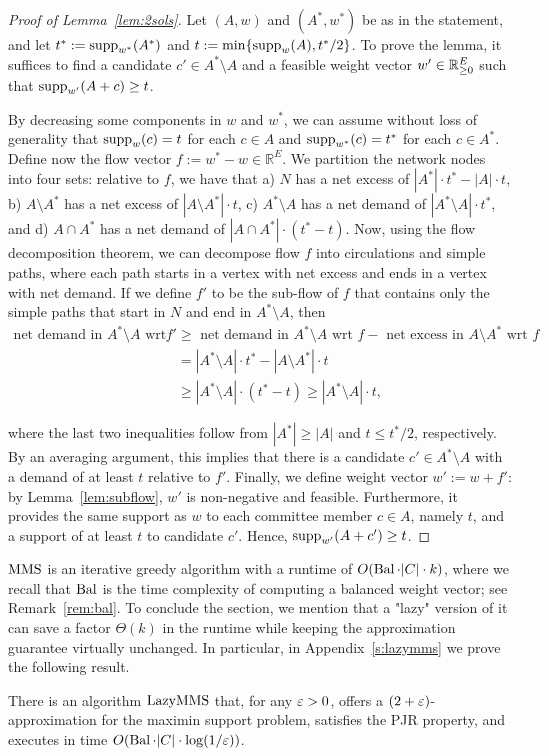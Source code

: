 \begin{proof}[Proof of Lemma~\ref{lem:2sols}]
Let $(A,w)$ and $(A^*, w^*)$ be as in the statement, and let $t^*:=\operatorname{supp}_{w^*}(A^*)$ and $t:=\min\{\operatorname{supp}_w(A), t^*/2\}$. To prove the lemma, it suffices to find a candidate $c'\in A^*\setminus A$ and a feasible weight vector $w'\in\mathbb{R}_{\geq 0}^E$ such that $\operatorname{supp}_{w'}(A+c)\geq t$.

By decreasing some components in $w$ and $w^*$, we can assume without loss of generality that $\operatorname{supp}_w(c)=t$ for each $c\in A$ and $\operatorname{supp}_{w^*}(c)=t^*$ for each $c\in A^*$. Define now the flow vector $f:=w^* - w\in\mathbb{R}^E$. 
We partition the network nodes into four sets: relative to $f$, we have that a) $N$ has a net excess of $|A^*|\cdot t^* - |A|\cdot t$, b) $A\setminus A^*$ has a net excess of $|A\setminus A^*|\cdot t$, c) $A^*\setminus A$ has a net demand of $|A^*\setminus A|\cdot t^*$, and d) $A\cap A^*$ has a net demand of $|A\cap A^*|\cdot (t^*-t)$.
Now, using the flow decomposition theorem, we can decompose flow $f$ into circulations and simple paths, where each path starts in a vertex with net excess and ends in a vertex with net demand. If we define $f'$ to be the sub-flow of $f$ that contains only the simple paths that start in $N$ and end in $A^*\setminus A$, then %
%
\begin{align*}
    \text{net demand in $A^*\setminus A$ wrt } f' &\geq \text{ net demand in $A^*\setminus A$ wrt } f - \text{ net excess in $A\setminus A^*$ wrt } f\\
    &= |A^*\setminus A|\cdot t^* - |A\setminus A^*|\cdot t\\
    &\geq |A^*\setminus A|\cdot (t^*-t) \geq |A^*\setminus A|\cdot t,
\end{align*}

where the last two inequalities follow from $|A^*|\geq |A|$ and $t\leq t^*/2$, respectively. By an averaging argument, this implies that there is a candidate $c'\in A^*\setminus A$ with a demand of at least $t$ relative to $f'$.
Finally, we define weight vector $w':=w+f'$: by Lemma~\ref{lem:subflow}, $w'$ is non-negative and feasible. 
Furthermore, it provides the same support as $w$ to each committee member $c\in A$, namely $t$, and a support of at least $t$ to candidate $c'$. Hence, $\operatorname{supp}_{w'}(A+c')\geq t$. 
\end{proof}

$\operatorname{MMS}$ is an iterative greedy algorithm with a runtime of $O(\operatorname{Bal} \cdot |C|\cdot k)$, where we recall that $\operatorname{Bal}$ is the time complexity of computing a balanced weight vector; see Remark~\ref{rem:bal}. 
To conclude the section, we mention that a "lazy" version of it can save a factor $\Theta(k)$ in the runtime while keeping the approximation guarantee virtually unchanged. 
In particular, in Appendix~\ref{s:lazymms} we prove the following result.

\begin{theorem}\label{thm:2eps}
There is an algorithm $\operatorname{LazyMMS}$ that, for any $\varepsilon>0$, offers a $(2+\varepsilon)$-approximation for the maximin support problem, satisfies the PJR property, and executes in time $O(\operatorname{Bal}\cdot |C|\cdot \log(1/\varepsilon))$.
\end{theorem}

